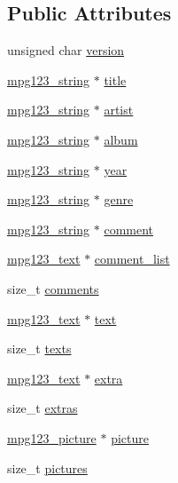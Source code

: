 \subsection*{Public Attributes}
\begin{DoxyCompactItemize}
\item 
unsigned char \hyperlink{structmpg123__id3v2_ab64e67e2d2bc5cc0b45e9598a8d386d6}{version}
\item 
\hyperlink{structmpg123__string}{mpg123\+\_\+string} $\ast$ \hyperlink{structmpg123__id3v2_ae911d27158f516c967792f3eae2bfcca}{title}
\item 
\hyperlink{structmpg123__string}{mpg123\+\_\+string} $\ast$ \hyperlink{structmpg123__id3v2_a8a9e75b7fd09312bd42fab5617a02981}{artist}
\item 
\hyperlink{structmpg123__string}{mpg123\+\_\+string} $\ast$ \hyperlink{structmpg123__id3v2_a9d22870f444b06491711047e791d6385}{album}
\item 
\hyperlink{structmpg123__string}{mpg123\+\_\+string} $\ast$ \hyperlink{structmpg123__id3v2_a323e61ee86cc7a2d0d889c78be8c8c9f}{year}
\item 
\hyperlink{structmpg123__string}{mpg123\+\_\+string} $\ast$ \hyperlink{structmpg123__id3v2_a9e3c182c64c51f148075dc9e0b1c3c84}{genre}
\item 
\hyperlink{structmpg123__string}{mpg123\+\_\+string} $\ast$ \hyperlink{structmpg123__id3v2_a6d8769e0a75c0fb81276b1a410070a44}{comment}
\item 
\hyperlink{structmpg123__text}{mpg123\+\_\+text} $\ast$ \hyperlink{structmpg123__id3v2_af6fc573b0ecf98724e0b020b768c6087}{comment\+\_\+list}
\item 
size\+\_\+t \hyperlink{structmpg123__id3v2_aa6b0ae610df4b4f5ed7f848ed88c86c9}{comments}
\item 
\hyperlink{structmpg123__text}{mpg123\+\_\+text} $\ast$ \hyperlink{structmpg123__id3v2_a1473b0e1751427d33a1560501003df38}{text}
\item 
size\+\_\+t \hyperlink{structmpg123__id3v2_a1ea43150e210d554f297bc317d5fb8ea}{texts}
\item 
\hyperlink{structmpg123__text}{mpg123\+\_\+text} $\ast$ \hyperlink{structmpg123__id3v2_a714f7dea3ba8a7b751fc76a4ac23c9e4}{extra}
\item 
size\+\_\+t \hyperlink{structmpg123__id3v2_afefe85eb6aea14e5463b83d4e8b9ef96}{extras}
\item 
\hyperlink{structmpg123__picture}{mpg123\+\_\+picture} $\ast$ \hyperlink{structmpg123__id3v2_a02b7ba6eb5e4172d262bde10e1f059bf}{picture}
\item 
size\+\_\+t \hyperlink{structmpg123__id3v2_ac13f50ac1a8d70b8be6580a71efc89b5}{pictures}
\end{DoxyCompactItemize}


